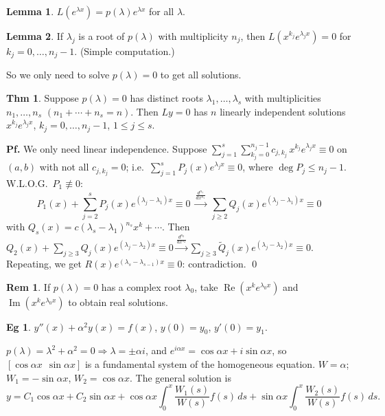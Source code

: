 \documentclass[11pt]{article}
\theoremstyle{definition}
\newtheorem*{theorem}{Thm}
\newtheorem*{lemma}{Lemma}
\newtheorem*{example}{Eg}
\newtheorem*{remark}{Rem}
\theoremstyle{remark}
\newcommand{\real}{\operatorname{Re}}
\newcommand{\imag}{\operatorname{Im}}
\begin{document}
\begin{lemma}
$L(e^{\lambda x})=p(\lambda)e^{\lambda x}$ for all $\lambda$.
\end{lemma}

\begin{lemma}
If $\lambda_j$ is a root of $p(\lambda)$ with multiplicity $n_j$, then
$L(x^{k_j}e^{\lambda_jx})=0$ for $k_j=0,\dots,n_j-1$. (Simple computation.)
\end{lemma}

So we only need to solve $p(\lambda)=0$ to get all solutions.

\begin{theorem}
Suppose $p(\lambda)=0$ has distinct roots $\lambda_1,\dots,\lambda_s$ with multiplicities
$n_1,\dots,n_s$ $(n_1+\cdots+n_s=n)$. Then $Ly=0$ has $n$ linearly independent solutions
$x^{k_j}e^{\lambda_jx}$, $k_j=0,\dots,n_j-1$, $1\le j\le s$.

\textbf{Pf.} We only need linear independence. Suppose $\sum_{j=1}^{s}\sum_{k_j=0}^{n_j-1}c_{j,k_j}\,x^{k_j}e^{\lambda_jx}\equiv0$
on $(a,b)$ with not all $c_{j,k_j}=0$; i.e.\ $\sum_{j=1}^{s}P_j(x)e^{\lambda_jx}\equiv0$, where
$\deg P_j \le n_j-1$. W.L.O.G.\ $P_1\not\equiv0$:
\[
P_1(x)+\sum_{j=2}^{s}P_j(x)e^{(\lambda_j-\lambda_1)x}\equiv0
\ \xrightarrow{\frac{d^{n_1}}{dx^{n_1}}}\ \sum_{j\ge2}Q_j(x)e^{(\lambda_j-\lambda_1)x}\equiv0
\]
with $Q_s(x)=c(\lambda_s-\lambda_1)^{n_s}x^k+\cdots$. Then
$Q_2(x)+\sum_{j\ge3}Q_j(x)e^{(\lambda_j-\lambda_2)x}\equiv0
\xrightarrow{\frac{d^{n_2}}{dx^{n_2}}} \sum_{j\ge3}\widetilde{Q}_j(x)e^{(\lambda_j-\lambda_2)x}\equiv0$.
Repeating, we get $R(x)e^{(\lambda_s-\lambda_{s-1})x}\equiv0$: contradiction. \qed
\end{theorem}

\begin{remark}
If $p(\lambda)=0$ has a complex root $\lambda_0$, take $\real(x^ke^{\lambda_0x})$ and
$\imag(x^ke^{\lambda_0x})$ to obtain real solutions.
\end{remark}

\begin{example}
$y''(x)+\alpha^2y(x)=f(x)$, $y(0)=y_0$, $y'(0)=y_1$.

$p(\lambda)=\lambda^2+\alpha^2=0 \Rightarrow \lambda=\pm\alpha i$, and
$e^{i\alpha x}=\cos\alpha x+i\sin\alpha x$, so $[\cos\alpha x\ \ \sin\alpha x]$ is a fundamental
system of the homogeneous equation. $W = \alpha$; $W_1=-\sin\alpha x$, $W_2=\cos\alpha x$. The
general solution is
\[
y=C_1\cos\alpha x+C_2\sin\alpha x+\cos\alpha x\int_0^{x}\frac{W_1(s)}{W(s)}f(s)\,ds+\sin\alpha x\int_0^{x}\frac{W_2(s)}{W(s)}f(s)\,ds.
\]
\end{example}
\end{document}
